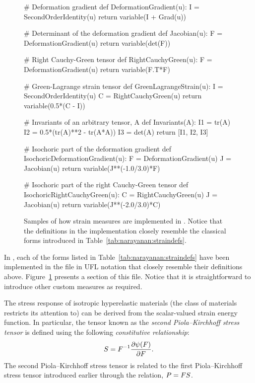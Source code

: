 \begin{figure}
\begin{python}
# Deformation gradient
def DeformationGradient(u):
    I = SecondOrderIdentity(u)
    return variable(I + Grad(u))

# Determinant of the deformation gradient
def Jacobian(u):
    F = DeformationGradient(u)
    return variable(det(F))

# Right Cauchy-Green tensor
def RightCauchyGreen(u):
    F = DeformationGradient(u)
    return variable(F.T*F)

# Green-Lagrange strain tensor
def GreenLagrangeStrain(u):
    I = SecondOrderIdentity(u)
    C = RightCauchyGreen(u)
    return variable(0.5*(C - I))

# Invariants of an arbitrary tensor, A
def Invariants(A):
    I1 = tr(A)
    I2 = 0.5*(tr(A)**2 - tr(A*A))
    I3 = det(A)
    return [I1, I2, I3]

# Isochoric part of the deformation gradient
def IsochoricDeformationGradient(u):
    F = DeformationGradient(u)
    J = Jacobian(u)
    return variable(J**(-1.0/3.0)*F)

# Isochoric part of the right Cauchy-Green tensor
def IsochoricRightCauchyGreen(u):
    C = RightCauchyGreen(u)
    J = Jacobian(u)
    return variable(J**(-2.0/3.0)*C)
\end{python}
\caption{Samples of how strain measures are implemented in
  \twist. Notice that the definitions in the implementation closely
  resemble the classical forms introduced in
  Table~\ref{tab:narayanan:straindefs}.}
\label{code:narayanan:kinematics.py}
\end{figure}

In \twist, each of the forms listed in
Table~\ref{tab:narayanan:straindefs} have been implemented in the file
 in UFL notation that closely resemble their
definitions above. Figure~\ref{code:narayanan:kinematics.py} presents
a section of this file. Notice that it is straightforward to introduce
other custom measures as required.

The stress response of isotropic hyperelastic materials (the class of
materials \twist{} restricts its attention to) can be derived from the
scalar-valued strain energy function. In particular, the tensor known
as the {\em second Piola--Kirchhoff stress tensor} is defined using the
following {\em constitutive relationship}:
\begin{equation}
\mbox{$ S$} = \mbox{$ F$}^{-1} \frac{\partial \psi(\mbox{$ F$})}{\partial \mbox{$ F$}}.
\end{equation}
The second Piola--Kirchhoff stress tensor is related to the first
Piola--Kirchhoff stress tensor introduced earlier through the relation,
$\mbox{$ P$} = \mbox{$ F$} \mbox{$ S$}$.


